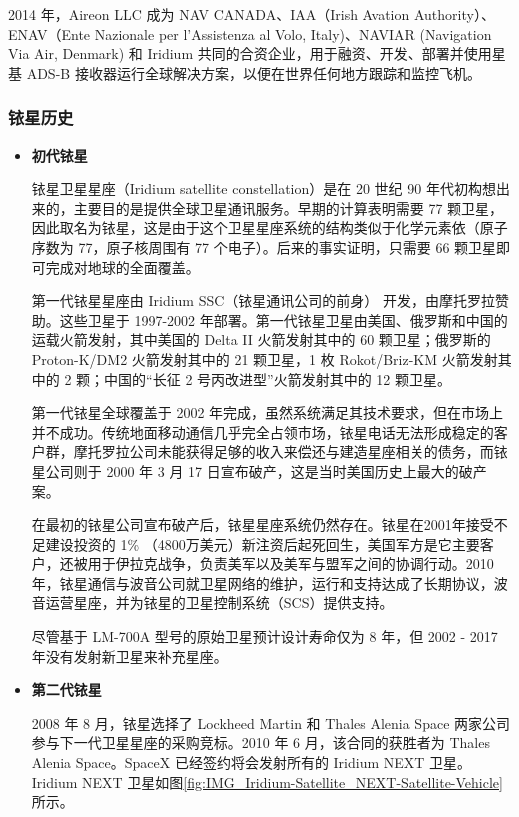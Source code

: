 2014 年，Aireon LLC 成为 NAV CANADA、IAA（Irish Avation Authority）、ENAV（Ente Nazionale per l'Assistenza al Volo, Italy)、NAVIAR (Navigation Via Air, Denmark) 和 Iridium 共同的合资企业，用于融资、开发、部署并使用星基 ADS-B 接收器运行全球解决方案，以便在世界任何地方跟踪和监控飞机。

\subsubsection{铱星历史}

\begin{itemize}
    \item \textbf{初代铱星}

    铱星卫星星座（Iridium satellite constellation）是在 20 世纪 90 年代初构想出来的，主要目的是提供全球卫星通讯服务。早期的计算表明需要 77 颗卫星，因此取名为铱星，这是由于这个卫星星座系统的结构类似于化学元素依（原子序数为 77，原子核周围有 77 个电子）。后来的事实证明，只需要 66 颗卫星即可完成对地球的全面覆盖。

    第一代铱星星座由 Iridium SSC（铱星通讯公司的前身） 开发，由摩托罗拉赞助。这些卫星于 1997-2002 年部署。第一代铱星卫星由美国、俄罗斯和中国的运载火箭发射，其中美国的 Delta II 火箭发射其中的 60 颗卫星；俄罗斯的 Proton-K/DM2 火箭发射其中的 21 颗卫星，1 枚 Rokot/Briz-KM 火箭发射其中的 2 颗；中国的“长征 2 号丙改进型”火箭发射其中的 12 颗卫星。

    第一代铱星全球覆盖于 2002 年完成，虽然系统满足其技术要求，但在市场上并不成功。传统地面移动通信几乎完全占领市场，铱星电话无法形成稳定的客户群，摩托罗拉公司未能获得足够的收入来偿还与建造星座相关的债务，而铱星公司则于 2000 年 3 月 17 日宣布破产，这是当时美国历史上最大的破产案。

    在最初的铱星公司宣布破产后，铱星星座系统仍然存在。铱星在2001年接受不足建设投资的 1\% （4800万美元）新注资后起死回生，美国军方是它主要客户，还被用于伊拉克战争，负责美军以及美军与盟军之间的协调行动。2010年，铱星通信与波音公司就卫星网络的维护，运行和支持达成了长期协议，波音运营星座，并为铱星的卫星控制系统（SCS）提供支持。

    尽管基于 LM-700A 型号的原始卫星预计设计寿命仅为 8 年，但 2002 - 2017 年没有发射新卫星来补充星座。

    \item \textbf{第二代铱星}

    2008 年 8 月，铱星选择了 Lockheed Martin 和 Thales Alenia Space 两家公司参与下一代卫星星座的采购竞标。2010 年 6 月，该合同的获胜者为 Thales Alenia Space。SpaceX 已经签约将会发射所有的 Iridium NEXT 卫星。Iridium NEXT 卫星如图\ref{fig:IMG_Iridium-Satellite_NEXT-Satellite-Vehicle}所示。


\end{itemize}
